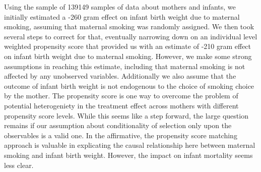\documentclass[12pt]{article}
\begin{document}
Using the sample of 139149 samples of data about mothers and infants, we initially estimated a -260 gram effect on infant birth weight due to maternal smoking, assuming that maternal smoking was randomly assigned. We then took several steps to correct for that, eventually narrowing down on an individual level weighted propensity score that provided us with an estimate of -210 gram effect on infant birth weight due to maternal smoking. However, we make some strong assumptions in reaching this estimate, including that maternal smoking is not affected by any unobserved variables. Additionally we also assume that the outcome of infant birth weight is not endogenous to the choice of smoking choice by the mother. The propensity score is one way to overcome the problem of potential heterogeniety in the treatment effect across mothers with different propensity score levels. While this seems like a step forward, the large question remains if our assumption about conditionality of selection only upon the observables is a valid one. In the affirmative, the propensity score matching approach is valuable in explicating the causal relationship here between maternal smoking and infant birth weight. However, the impact on infant mortality seems less clear.

 

\end{document}
